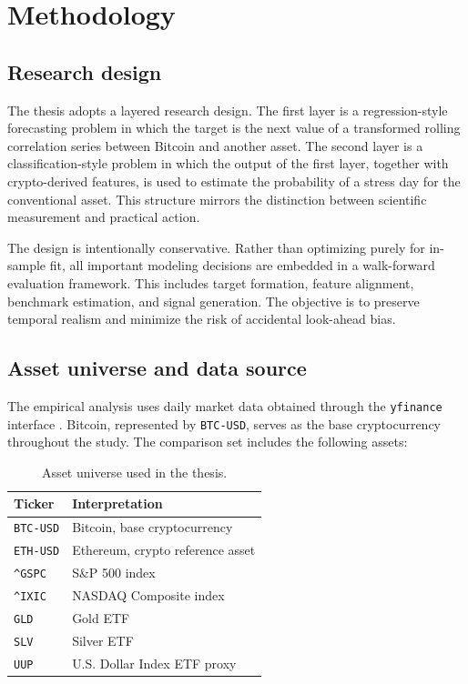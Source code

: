 \section{Methodology}

\subsection{Research design}

The thesis adopts a layered research design. The first layer is a regression-style forecasting problem in which the target is the next value of a transformed rolling correlation series between Bitcoin and another asset. The second layer is a classification-style problem in which the output of the first layer, together with crypto-derived features, is used to estimate the probability of a stress day for the conventional asset. This structure mirrors the distinction between scientific measurement and practical action.

The design is intentionally conservative. Rather than optimizing purely for in-sample fit, all important modeling decisions are embedded in a walk-forward evaluation framework. This includes target formation, feature alignment, benchmark estimation, and signal generation. The objective is to preserve temporal realism and minimize the risk of accidental look-ahead bias.

\subsection{Asset universe and data source}

The empirical analysis uses daily market data obtained through the \texttt{yfinance} interface \cite{yfinance2026}. Bitcoin, represented by \texttt{BTC-USD}, serves as the base cryptocurrency throughout the study. The comparison set includes the following assets:

\begin{table}[H]
    \centering
    \caption{Asset universe used in the thesis.}
    \label{tab:asset_universe}
    \begin{tabular}{ll}
        \toprule
        Ticker & Interpretation \\
        \midrule
        \texttt{BTC-USD} & Bitcoin, base cryptocurrency \\
        \texttt{ETH-USD} & Ethereum, crypto reference asset \\
        \texttt{\^{}GSPC} & S\&P 500 index \\
        \texttt{\^{}IXIC} & NASDAQ Composite index \\
        \texttt{GLD} & Gold ETF \\
        \texttt{SLV} & Silver ETF \\
        \texttt{UUP} & U.S. Dollar Index ETF proxy \\
        \bottomrule
    \end{tabular}
\end{table}

